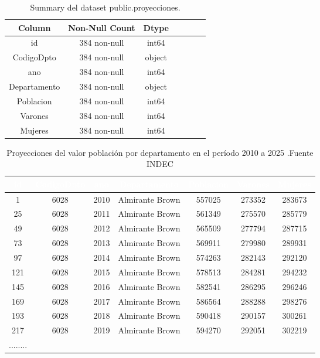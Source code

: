 \documentclass{article}
\theoremstyle{mytheoremstyle}
\theoremstyle{mytheoremstyle}
\theoremstyle{myproblemstyle}
\begin{document}
 \begin{table}[htbp]
  \centering
  \begin{tabular}{ccccccc}
  \toprule
  \textbf{Column} & \textbf{Non-Null Count} & \textbf{Dtype} \\
  \midrule
  id            & 384 non-null & int64 \\
  CodigoDpto    & 384 non-null & object \\
  ano           & 384 non-null & int64 \\
  Departamento  & 384 non-null & object \\
  Poblacion     & 384 non-null & int64 \\
  Varones       & 384 non-null & int64 \\
  Mujeres       & 384 non-null & int64 \\
  \bottomrule
  \end{tabular}
  \caption{Summary del dataset public.proyecciones.}
  \label{tab:ProyeccSummary}
  \end{table}

  \begin{table}[htb]
    \centering
    \begin{tabular}{|c|c|c|c|c|c|c|}
    \hline
    \textbf{\cellcolor[rgb]{0,0.231,0.427}\textcolor{white}{id}} & \textbf{\cellcolor[rgb]{0,0.231,0.427}\textcolor{white}{CodigoDpto}} & \textbf{\cellcolor[rgb]{0,0.231,0.427}\textcolor{white}{ano}} & \textbf{\cellcolor[rgb]{0,0.231,0.427}\textcolor{white}{Departamento}} & \textbf{\cellcolor[rgb]{0,0.231,0.427}\textcolor{white}{Poblacion}} & \textbf{\cellcolor[rgb]{0,0.231,0.427}\textcolor{white}{Varones}} & \textbf{\cellcolor[rgb]{0,0.231,0.427}\textcolor{white}{Mujeres}} \\ \hline
    1 & 6028 & 2010 & Almirante Brown & 557025 & 273352 & 283673 \\
    25 & 6028 & 2011 & Almirante Brown & 561349 & 275570 & 285779 \\
    49 & 6028 & 2012 & Almirante Brown & 565509 & 277794 & 287715 \\
    73 & 6028 & 2013 & Almirante Brown & 569911 & 279980 & 289931 \\
    97 & 6028 & 2014 & Almirante Brown & 574263 & 282143 & 292120 \\
    121 & 6028 & 2015 & Almirante Brown & 578513 & 284281 & 294232 \\
    145 & 6028 & 2016 & Almirante Brown & 582541 & 286295 & 296246 \\
    169 & 6028 & 2017 & Almirante Brown & 586564 & 288288 & 298276 \\
    193 & 6028 & 2018 & Almirante Brown & 590418 & 290157 & 300261 \\
    217 & 6028 & 2019 & Almirante Brown & 594270 & 292051 & 302219 \\
    ........ &&&&&& \\
    \hline
    \end{tabular}
    \caption{ Proyecciones del valor población por departamento en el período 2010 a 2025 .Fuente INDEC}
    \label{tab:proyecHead}
    \end{table}
\end{document}
